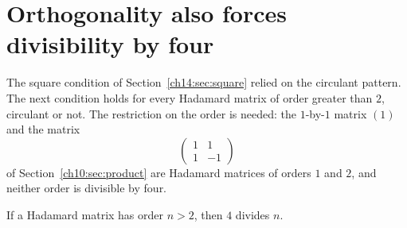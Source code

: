 \section{Orthogonality also forces divisibility by four}\label{ch14:sec:four}
The square condition of Section~\ref{ch14:sec:square} relied on the circulant pattern. The next condition holds for every Hadamard matrix of order greater than $2$, circulant or not. The restriction on the order is needed: the $1$-by-$1$ matrix $(1)$ and the matrix
\[
\begin{pmatrix}1&1\\1&-1\end{pmatrix}
\]
of Section~\ref{ch10:sec:product} are Hadamard matrices of orders $1$ and $2$, and neither order is divisible by four.

\par\noindent\begin{minipage}{\linewidth}
\begin{lemma}\label{thm:hadamardorder}
If a Hadamard matrix has order $n>2$, then $4$ divides $n$.
\end{lemma}
\end{minipage}\par

